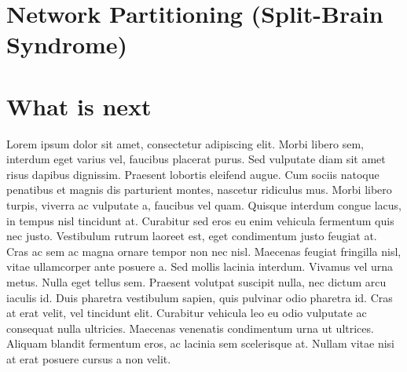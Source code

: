 \section{Network Partitioning (Split-Brain Syndrome)}

\section{What is next}
Lorem ipsum dolor sit amet, consectetur adipiscing elit. Morbi libero sem,
interdum eget varius vel, faucibus placerat purus. Sed vulputate diam sit amet
risus dapibus dignissim. Praesent lobortis eleifend augue. Cum sociis natoque
penatibus et magnis dis parturient montes, nascetur ridiculus mus. Morbi libero
turpis, viverra ac vulputate a, faucibus vel quam. Quisque interdum congue
lacus, in tempus nisl tincidunt at. Curabitur sed eros eu enim vehicula
fermentum quis nec justo. Vestibulum rutrum laoreet est, eget condimentum justo
feugiat at. Cras ac sem ac magna ornare tempor non nec nisl. Maecenas feugiat
fringilla nisl, vitae ullamcorper ante posuere a. Sed mollis lacinia interdum.
Vivamus vel urna metus. Nulla eget tellus sem. Praesent volutpat suscipit nulla,
nec dictum arcu iaculis id. Duis pharetra vestibulum sapien, quis pulvinar odio
pharetra id. Cras at erat velit, vel tincidunt elit. Curabitur vehicula leo eu
odio vulputate ac consequat nulla ultricies. Maecenas venenatis condimentum
urna ut ultrices. Aliquam blandit fermentum eros, ac lacinia sem scelerisque
at. Nullam vitae nisi at erat posuere cursus a non velit.
